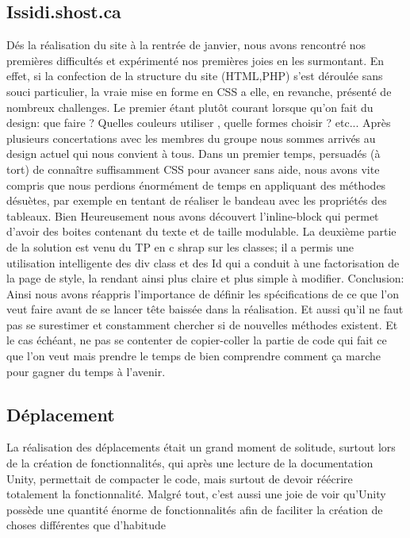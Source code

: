 ﻿\documentclass{article}
\begin{document}
\subsection{Issidi.shost.ca}
Dés la réalisation du site à la rentrée de janvier, nous avons rencontré nos premières difficultés et expérimenté nos premières joies en les surmontant. 
\newline  En effet, si la confection de la structure du site (HTML,PHP) s'est déroulée sans souci particulier, la vraie mise en forme en CSS a elle, en revanche, présenté de nombreux challenges.
\newline	Le premier étant plutôt courant lorsque qu'on fait du design: que faire ? Quelles couleurs utiliser , quelle formes choisir ? etc...
Après plusieurs concertations avec les membres du groupe nous sommes arrivés au design actuel qui nous convient à tous.
\newline	Dans un premier temps, persuadés  (à tort) de connaître suffisamment CSS pour avancer sans aide, nous avons vite compris que nous perdions énormément de temps en appliquant des méthodes désuètes, par exemple en tentant de réaliser le bandeau avec les propriétés des tableaux. Bien Heureusement nous avons découvert l'inline-block qui permet d'avoir des boites contenant du texte et de  taille modulable. La deuxième partie de la solution est venu du TP en c shrap sur les classes; il a permis une utilisation intelligente des div class et des Id qui a conduit à une factorisation de la page de style, la rendant ainsi plus claire et plus simple à modifier.
\newline\newline
Conclusion:
\newline Ainsi nous avons réappris l'importance de définir les spécifications de ce que l'on veut faire avant de se lancer tête baissée dans la réalisation. Et aussi qu'il ne faut pas se surestimer et constamment chercher si de nouvelles méthodes existent. Et le cas échéant, ne pas se contenter de copier-coller la partie de code qui fait ce que l'on veut mais prendre le temps de bien comprendre comment ça marche pour gagner du temps à l'avenir.

\subsection{Déplacement}
La réalisation des déplacements était un grand moment de solitude, surtout lors de la création de fonctionnalités,
qui après une lecture de la documentation Unity, permettait de compacter le code, mais surtout de devoir réécrire
totalement la fonctionnalité.
Malgré tout, c'est aussi une joie de voir qu'Unity possède une quantité énorme de fonctionnalités
afin de faciliter la création de choses différentes que d'habitude
\end{document}
